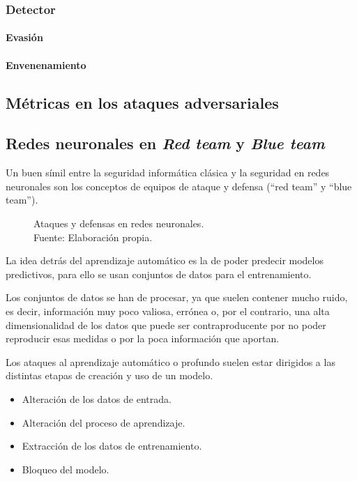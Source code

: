 \subsubsection{Detector}
\paragraph{Evasión}
\paragraph{Envenenamiento}

\subsection{Métricas en los ataques adversariales}

\subsection{Redes neuronales en \textit{Red team} y \textit{Blue team}}
Un buen símil entre la seguridad informática clásica y la seguridad en redes neuronales son los conceptos de equipos de ataque y defensa (``red team'' y ``blue team'').

\begin{figure}[H]
    \centering
    \centerline{}
    \caption{Ataques y defensas en redes neuronales.\\Fuente: Elaboración propia.}
    \label{fig:art-for-red-and-blue-teams}
\end{figure}

La idea detrás del aprendizaje automático es la de poder predecir modelos predictivos, para ello se usan conjuntos de datos para el entrenamiento.

Los conjuntos de datos se han de procesar, ya que suelen contener mucho ruido, es decir, información muy poco valiosa, errónea o, por el contrario, una alta dimensionalidad de los datos que puede ser contraproducente por no poder reproducir esas medidas o por la poca información que aportan.

Los ataques al aprendizaje automático o profundo suelen estar dirigidos a las distintas etapas de creación y uso de un modelo.

\begin{itemize}
    \item Alteración de los datos de entrada.
    \item Alteración del proceso de aprendizaje.
    \item Extracción de los datos de entrenamiento.
    \item Bloqueo del modelo.
\end{itemize}

